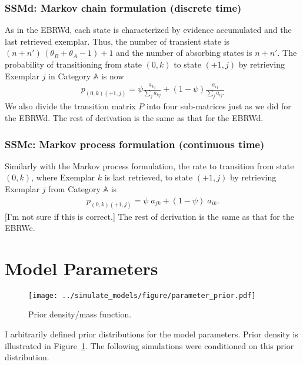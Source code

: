 \documentclass[doc]{apa6}
\begin{document}
\subsubsection{SSMd: Markov chain formulation (discrete time)}

As in the EBRWd, each state is characterized by evidence accumulated and the last retrieved
exemplar. Thus, the number of transient state is $(n + n') \, (\theta_{B} + \theta_{A} - 1) + 1$ and
the number of absorbing states is $n + n'$.  The probability of transitioning from state $(0, k)$ to
state $(+1, j)$ by retrieving Exemplar $j$ in Category $\mathbb{A}$ is now
\begin{align}
    p_{(0,k)(+1,j)} = \psi \frac{a_{kj}}{\sum_{j} a_{kj}}  +
                      (1 - \psi) \frac{a_{ij}}{\sum_{j} a_{ij}.}
\end{align}
We also divide the transition matrix $P$ into four sub-matrices just as we did for the EBRWd. The
rest of derivation is the same as that for the EBRWd.


\subsubsection{SSMc: Markov process formulation (continuous time)}

Similarly with the Markov process formulation, the rate to transition from state $(0,k)$, where Exemplar
$k$ is last retrieved, to state $(+1,j)$ by retrieving Exemplar $j$ from Category $\mathbb{A}$ is
\begin{align}
    p_{(0,k)(+1,j)} = \psi \; a_{jk} + (1 - \psi) \; a_{ik}.
\end{align}
{\color{red} [I'm not sure if this is correct.]}
The rest of derivation is the same as that for the EBRWc.


\section{Model Parameters}

\begin{figure}
    \centering
    \texttt{[image: ../simulate\_models/figure/parameter\_prior.pdf]}

    \caption{Prior density/mass function.}

\label{fig:parameter_prior}
\end{figure}

I arbitrarily defined prior distributions for the model parameters. Prior density is illustrated in
Figure~\ref{fig:parameter_prior}. The following simulations were conditioned on this prior
distribution.
\end{document}
